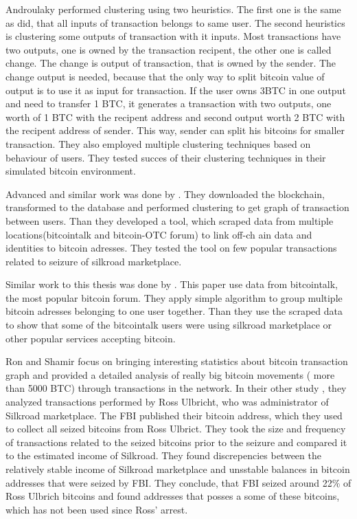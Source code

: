 \documentclass[
  digital, %
  table,   %
  lof,     %
  lot,     %
  oneside
]{fithesis3}
\begin{document}
Androulaky \parencite{androulaki2013evaluating} performed clustering using two heuristics.
The first one is the same as \parencite{reid2013analysis} did, that all inputs of transaction
belongs to same user. The second heuristics is clustering some outputs of transaction with it inputs.
Most transactions have two outputs, one is owned by the transaction recipent,
the other one is called change. The change is output of transaction, that is owned by
the sender. The change output is needed, because that the only way to split
 bitcoin value of output is to use it as input for transaction.
 If the user owns 3BTC in one output and need to transfer 1 BTC, it generates a transaction
 with two outputs, one worth of 1 BTC with the recipent address and second output worth 2 BTC 
 with the recipent address of sender. This way, sender can split his bitcoins for smaller transaction.
 They also employed multiple clustering techniques based on behaviour of users.
 They tested succes of their clustering techniques in their simulated bitcoin 
 environment.

Advanced and similar work was done by \parencite{spagnuolo2014bitiodine}. They downloaded the blockchain, transformed to
 the database
and performed clustering to get graph of transaction between users.
Than they developed a tool, which scraped data from multiple locations(bitcointalk and bitcoin-OTC forum) to link off-ch
ain data and identities to bitcoin adresses.
They tested the tool on few popular transactions related to seizure of silkroad marketplace.

Similar work to this thesis was done by \parencite{fleder2015bitcoin}.
This paper use data from bitcointalk, the most popular bitcoin forum. 
They apply simple algorithm to group multiple bitcoin adresses belonging to one user together.
Than they use the scraped data to show
that some of the bitcointalk users were using silkroad marketplace or other popular services accepting bitcoin.
 
Ron and Shamir \parencite{ron2013quantitative} focus on bringing
interesting statistics about bitcoin transaction graph
and provided a detailed analysis of really big bitcoin movements ( more than 5000 BTC) 
through transactions in the network.
In their other study \parencite{ron2014did}, they analyzed transactions performed by Ross Ulbricht,
who was administrator of Silkroad marketplace.
The FBI published their bitcoin address, which they used to collect all seized bitcoins from Ross Ulbrict.
They took the size and frequency of transactions related to the seized bitcoins prior to the seizure and compared 
it to the estimated income of Silkroad. They found discrepencies between the
relatively stable income of Silkroad marketplace and unsstable balances in bitcoin addresses
that were seized by FBI. They conclude, that FBI seized around 22\% of Ross Ulbrich bitcoins
and found addresses that posses a some of these bitcoins, which has not been used since Ross' arrest.
\end{document}
